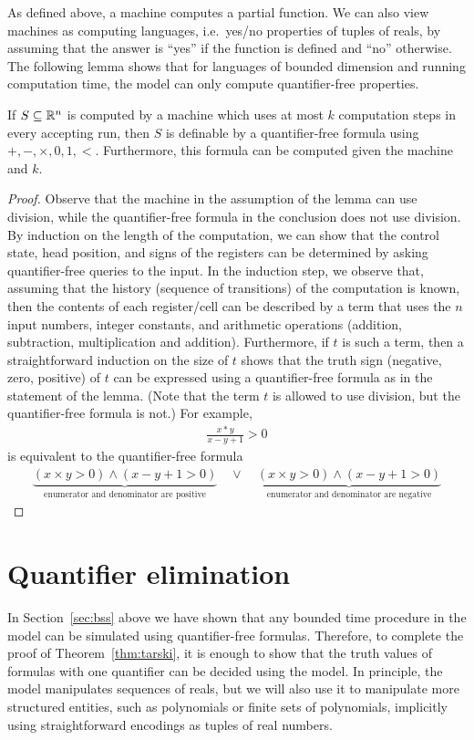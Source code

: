 As defined above, a \bss machine computes a partial function. We can also view \bss machines as computing languages, i.e.~yes/no properties of tuples of reals, by assuming that the answer is ``yes'' if the function is defined and ``no'' otherwise. The following lemma shows that for languages of bounded dimension and running computation time, the \bss model can only compute quantifier-free properties. 
\begin{lemma}\label{lem:bss-qf}
If $S \subseteq  \mathbb R^n$ is computed by a \bss machine which uses  at most $k$ computation steps in every accepting run, then $S$ is  definable by a quantifier-free formula using $+,-,\times,0,1,<$. Furthermore, this formula can be computed given the machine and $k$.
\end{lemma}
\begin{proof} Observe that the machine in the assumption of the lemma can use division, while the quantifier-free formula in the conclusion does not use division.
By 	induction on the length of the computation, we can show that the control state, head position,  and signs of the registers can be determined by asking  quantifier-free queries to the input. In the induction step, we observe that, assuming that the history (sequence of transitions) of the computation is known, then the contents of each register/cell can be described by a term that uses the $n$ input numbers, integer constants, and arithmetic operations (addition, subtraction, multiplication and addition). Furthermore, if $t$ is such a term, then a straightforward induction on the size of $t$ shows that  the truth sign (negative, zero, positive)  of  $t$ can be expressed using a quantifier-free formula as in the statement of the lemma. (Note that the term $t$ is allowed to use division, but the quantifier-free formula is not.) For example, 
\begin{align*}
 \frac {x * y } {x - y + 1} > 0
\end{align*}
is equivalent to the quantifier-free formula
\begin{align*}
\underbrace{(x \times y > 0) \land (x -y +1 >0)}_{\text{enumerator and denominator are positive}} \quad \lor \quad \underbrace{(x \times y > 0) \land (x -y +1 >0)}_{\text{enumerator and denominator are negative}}
\end{align*}
\end{proof}


\section{Quantifier elimination}
\label{sec:quantifier-elimination}
In Section~\ref{sec:bss} above we have shown that any bounded time procedure in the \bss model can be simulated using quantifier-free formulas. Therefore, to complete the proof of Theorem~\ref{thm:tarski}, it is enough to show that the truth values of formulas with one quantifier can be decided using the \bss model. In principle, the \bss model manipulates sequences of reals, but we will also use it to manipulate more structured entities, such as polynomials or finite sets of polynomials, implicitly using straightforward encodings as tuples of real numbers. 

